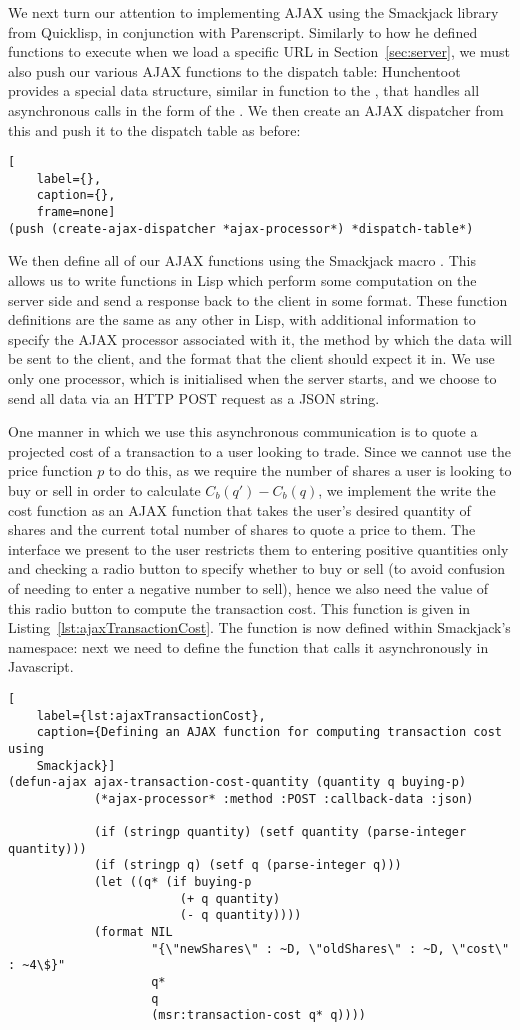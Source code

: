 We next turn our attention to implementing AJAX using the Smackjack library
from Quicklisp, in conjunction with Parenscript. Similarly to how he defined
functions to execute when we load a specific URL in Section~\ref{sec:server},
we must also push our various AJAX functions to the dispatch table: Hunchentoot
provides a special data structure, similar in function to the
, that handles all asynchronous calls in the form of the
. We then create an AJAX dispatcher from this and push it
to the dispatch table as before: 

\begin{lstlisting}[
	label={},
	caption={},
	frame=none]
(push (create-ajax-dispatcher *ajax-processor*) *dispatch-table*)
\end{lstlisting}

We then define all of our AJAX functions using the Smackjack macro
. This allows us to write functions in Lisp which perform some
computation on the server side and send a response back to the client in some
format. These function definitions are the same as any other in Lisp, with
additional information to specify the AJAX processor associated with it, the
method by which the data will be sent to the client, and the format that the
client should expect it in. We use only one processor, 
which is initialised when the server starts, and we choose to send all data via
an HTTP POST request as a JSON string.

One manner in which we use this asynchronous communication is to quote a
projected cost of a transaction to a user looking to trade. Since we cannot use
the price function $p$ to do this, as we require the number of shares a user is
looking to buy or sell in order to calculate $C_b(q')-C_b(q)$, we implement the
write the cost function as an AJAX function that takes the user's desired
quantity of shares and the current total number of shares to quote a price to
them. The interface we present to the user restricts them to entering positive
quantities only and checking a radio button to specify whether to buy or sell
(to avoid confusion of needing to enter a negative number to sell), hence we
also need the value of this radio button to compute the transaction cost. This
function is given in Listing~\ref{lst:ajaxTransactionCost}. The function is now
defined within Smackjack's namespace: next we need to define the function that
calls it asynchronously in Javascript.

\begin{lstlisting}[
	label={lst:ajaxTransactionCost},
	caption={Defining an AJAX function for computing transaction cost using
	Smackjack}]
(defun-ajax ajax-transaction-cost-quantity (quantity q buying-p)
			(*ajax-processor* :method :POST :callback-data :json)

			(if (stringp quantity) (setf quantity (parse-integer quantity)))
			(if (stringp q) (setf q (parse-integer q)))
			(let ((q* (if buying-p
						(+ q quantity)
						(- q quantity))))
			(format NIL 
					"{\"newShares\" : ~D, \"oldShares\" : ~D, \"cost\" : ~4\$}"
					q*
					q
					(msr:transaction-cost q* q))))
\end{lstlisting}

